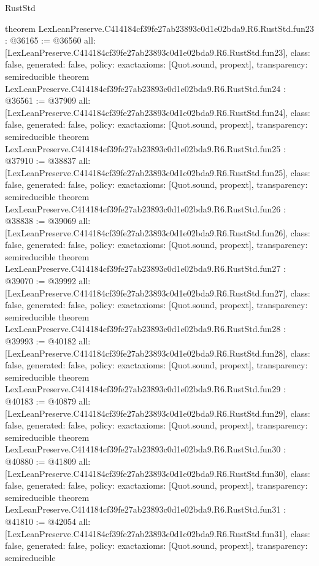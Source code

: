 \begin{lexlean}{RustStd}
\begin{coremodule}
{}
theorem LexLeanPreserve.C414184cf39fe27ab23893c0d1e02bda9.R6.RustStd.fun23 : @36165 := @36560 {
  all: [LexLeanPreserve.C414184cf39fe27ab23893c0d1e02bda9.R6.RustStd.fun23],
  class: false,
  generated: false,
  policy: exact{axioms: [Quot.sound, propext]},
  transparency: semireducible
}
theorem LexLeanPreserve.C414184cf39fe27ab23893c0d1e02bda9.R6.RustStd.fun24 : @36561 := @37909 {
  all: [LexLeanPreserve.C414184cf39fe27ab23893c0d1e02bda9.R6.RustStd.fun24],
  class: false,
  generated: false,
  policy: exact{axioms: [Quot.sound, propext]},
  transparency: semireducible
}
theorem LexLeanPreserve.C414184cf39fe27ab23893c0d1e02bda9.R6.RustStd.fun25 : @37910 := @38837 {
  all: [LexLeanPreserve.C414184cf39fe27ab23893c0d1e02bda9.R6.RustStd.fun25],
  class: false,
  generated: false,
  policy: exact{axioms: [Quot.sound, propext]},
  transparency: semireducible
}
theorem LexLeanPreserve.C414184cf39fe27ab23893c0d1e02bda9.R6.RustStd.fun26 : @38838 := @39069 {
  all: [LexLeanPreserve.C414184cf39fe27ab23893c0d1e02bda9.R6.RustStd.fun26],
  class: false,
  generated: false,
  policy: exact{axioms: [Quot.sound, propext]},
  transparency: semireducible
}
theorem LexLeanPreserve.C414184cf39fe27ab23893c0d1e02bda9.R6.RustStd.fun27 : @39070 := @39992 {
  all: [LexLeanPreserve.C414184cf39fe27ab23893c0d1e02bda9.R6.RustStd.fun27],
  class: false,
  generated: false,
  policy: exact{axioms: [Quot.sound, propext]},
  transparency: semireducible
}
theorem LexLeanPreserve.C414184cf39fe27ab23893c0d1e02bda9.R6.RustStd.fun28 : @39993 := @40182 {
  all: [LexLeanPreserve.C414184cf39fe27ab23893c0d1e02bda9.R6.RustStd.fun28],
  class: false,
  generated: false,
  policy: exact{axioms: [Quot.sound, propext]},
  transparency: semireducible
}
theorem LexLeanPreserve.C414184cf39fe27ab23893c0d1e02bda9.R6.RustStd.fun29 : @40183 := @40879 {
  all: [LexLeanPreserve.C414184cf39fe27ab23893c0d1e02bda9.R6.RustStd.fun29],
  class: false,
  generated: false,
  policy: exact{axioms: [Quot.sound, propext]},
  transparency: semireducible
}
theorem LexLeanPreserve.C414184cf39fe27ab23893c0d1e02bda9.R6.RustStd.fun30 : @40880 := @41809 {
  all: [LexLeanPreserve.C414184cf39fe27ab23893c0d1e02bda9.R6.RustStd.fun30],
  class: false,
  generated: false,
  policy: exact{axioms: [Quot.sound, propext]},
  transparency: semireducible
}
theorem LexLeanPreserve.C414184cf39fe27ab23893c0d1e02bda9.R6.RustStd.fun31 : @41810 := @42054 {
  all: [LexLeanPreserve.C414184cf39fe27ab23893c0d1e02bda9.R6.RustStd.fun31],
  class: false,
  generated: false,
  policy: exact{axioms: [Quot.sound, propext]},
  transparency: semireducible
}
\end{coremodule}
\end{lexlean}
